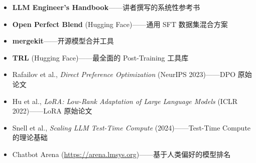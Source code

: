 \begin{itemize}
    \item \textbf{LLM Engineer's Handbook}——讲者撰写的系统性参考书
    \item \textbf{Open Perfect Blend} (Hugging Face)——通用 SFT 数据集混合方案
    \item \textbf{mergekit}——开源模型合并工具
    \item \textbf{TRL} (Hugging Face)——最全面的 Post-Training 工具库
    \item Rafailov et al., \textit{Direct Preference Optimization} (NeurIPS 2023)——DPO 原始论文
    \item Hu et al., \textit{LoRA: Low-Rank Adaptation of Large Language Models} (ICLR 2022)——LoRA 原始论文
    \item Snell et al., \textit{Scaling LLM Test-Time Compute} (2024)——Test-Time Compute 的理论基础
    \item Chatbot Arena (\url{https://arena.lmsys.org})——基于人类偏好的模型排名
\end{itemize}



